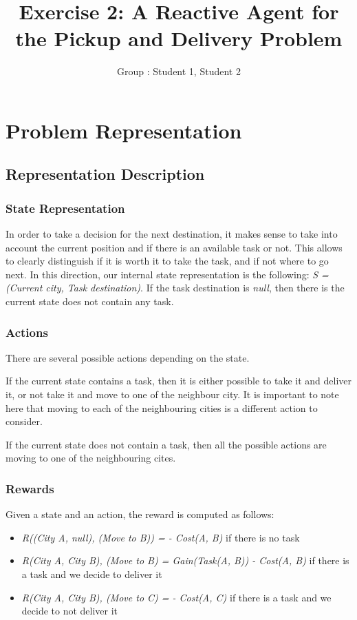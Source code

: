 \documentclass[11pt]{article}
\title{\bf Exercise 2: A Reactive Agent for the Pickup and Delivery Problem}
\author{Group \textnumero: Student 1, Student 2}
\begin{document}
\maketitle

\section{Problem Representation}

\subsection{Representation Description}
\subsubsection{State Representation}
In order to take a decision for the next destination, it makes sense to take into account the current position and if there is an available task or not. This allows to clearly distinguish if it is worth it to take the task, and if not where to go next. In this direction, our internal state representation is the following: \textit{S = (Current city, Task destination)}. If the task destination is \textit{null}, then there is the current state does not contain any task.

\subsubsection{Actions}
There are several possible actions depending on the state. 

If the current state contains a task, then it is either possible to take it and deliver it, or not take it and move to one of the neighbour city. It is important to note here that moving to each of the neighbouring cities is a different action to consider.

If the current state does not contain a task, then all the possible actions are moving to one of the neighbouring cites.

\subsubsection{Rewards}
Given a state and an action, the reward is computed as follows:
\begin{itemize}
	\item \textit{R((City A, null), (Move to B)) = - Cost(A, B)} if there is no task
	\item \textit{R(City A, City B), (Move to B) = Gain(Task(A, B)) - Cost(A, B)} if there is a task and we decide to deliver it
	\item \textit{R(City A, City B), (Move to C) =  - Cost(A, C)} if there is a task and we decide to not deliver it
\end{itemize}
\end{document}
